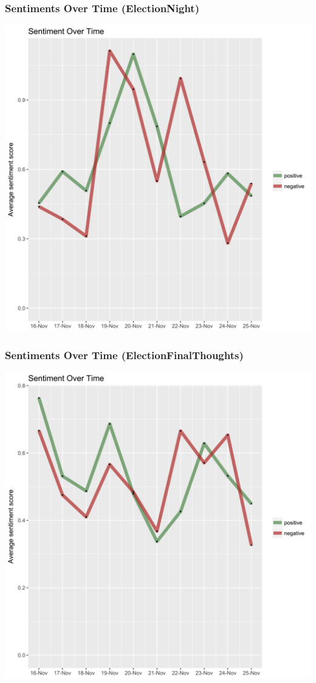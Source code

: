 \documentclass{beamer}
\begin{document}
\begin{frame}
	\frametitle{Sentiments Over Time (ElectionNight)}
  \includegraphics[height = 0.9\textheight]{ensentiments}
\end{frame}

\begin{frame}
	\frametitle{Sentiments Over Time (ElectionFinalThoughts)}
  \includegraphics[height = 0.9\textheight]{eftsentiments}
\end{frame}
\end{document}
